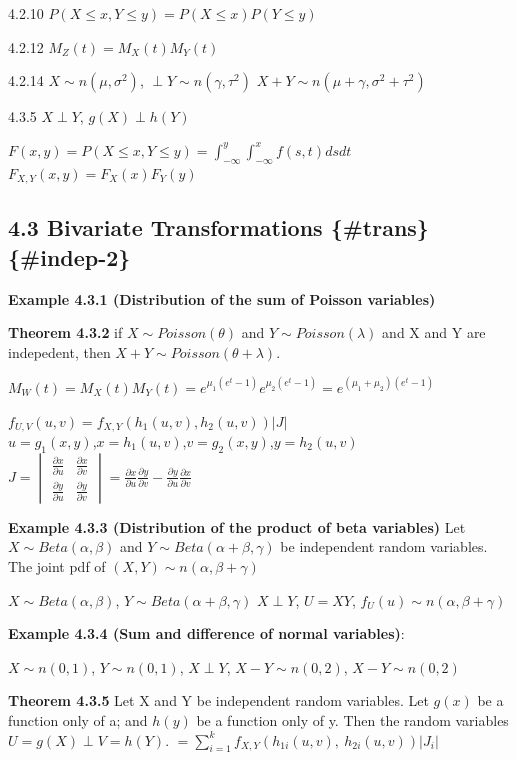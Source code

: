 \documentclass[10pt,twocolumn,portrait]{article}
\begin{document}
4.2.10 \(P(X\le x,Y\le y)=P(X\le x)P(Y\le y)\)

4.2.12 \(M_Z(t)=M_X(t)M_Y(t)\)

4.2.14 \(X\sim n(\mu,\sigma^2)\), \(\perp Y\sim n(\gamma,\tau^2)\)
\(X+Y\sim n(\mu+\gamma,\sigma^2+\tau^2)\)

4.3.5 \(X\perp Y\), \(g(X)\perp h(Y)\)

\(F(x,y)=P(X\le x, Y\le y)=\int_{-\infty}^{y}\int_{-\infty}^{x}f(s,t)dsdt\)
\(F_{X,Y}(x,y)=F_X(x)F_Y(y)\)

\hypertarget{Cauchy}{%
\subsection{4.3 Bivariate Transformations \{\#trans\}
\{\#indep-2\}}\label{Cauchy}}

\textbf{Example 4.3.1 (Distribution of the sum of Poisson variables)}

\textbf{Theorem 4.3.2} if \(X\sim Poisson(\theta)\) and
\(Y\sim Poisson(\lambda)\) and X and Y are indepedent, then
\(X+Y\sim Poisson(\theta+\lambda)\).

\(M_W(t)=M_X(t)M_Y(t)=e^{\mu_1(e^t-1)}e^{\mu_2(e^t-1)}=e^{(\mu_1+\mu_2)(e^t-1)}\)

\(f_{U,V}(u,v)=f_{X,Y}(h_1(u,v),h_2(u,v))|J|\)\\
\(u=g_1(x,y)\),\(x=h_1(u,v)\),\(v=g_2(x,y)\),\(y=h_2(u,v)\)
\(J=\begin{vmatrix}\frac{\partial x}{\partial u} & \frac{\partial x}{\partial v} \\ \frac{\partial y}{\partial u} & \frac{\partial y}{\partial v} \end{vmatrix}=\frac{\partial x}{\partial u}\frac{\partial y}{\partial v}-\frac{\partial y}{\partial u}\frac{\partial x}{\partial v}\)

\textbf{Example 4.3.3 (Distribution of the product of beta variables)}
Let \(X\sim Beta(\alpha,\beta)\) and \(Y\sim Beta(\alpha+\beta,\gamma)\)
be independent random variables. The joint pdf of
\((X,Y)\sim n(\alpha,\beta+\gamma)\)

\(X\sim Beta(\alpha,\beta)\), \(Y\sim Beta(\alpha+\beta,\gamma)\)
\(X\perp Y\), \(U=XY\), \(f_U(u)\sim n(\alpha,\beta+\gamma)\)

\textbf{Example 4.3.4 (Sum and difference of normal variables)}:

\(X\sim n(0,1)\), \(Y\sim n(0,1)\), \(X\perp Y\), \(X-Y\sim n(0,2)\),
\(X-Y\sim n(0,2)\)

\textbf{Theorem 4.3.5} Let X and Y be independent random variables. Let
\(g(x)\) be a function only of a; and \(h(y)\) be a function only of y.
Then the random variables \(U=g(X)\perp V=h(Y)\).
\(=\sum_{i=1}^kf_{X,Y}(h_{1i}(u,v),\ h_{2i}(u,v))|J_i|\)
\end{document}
